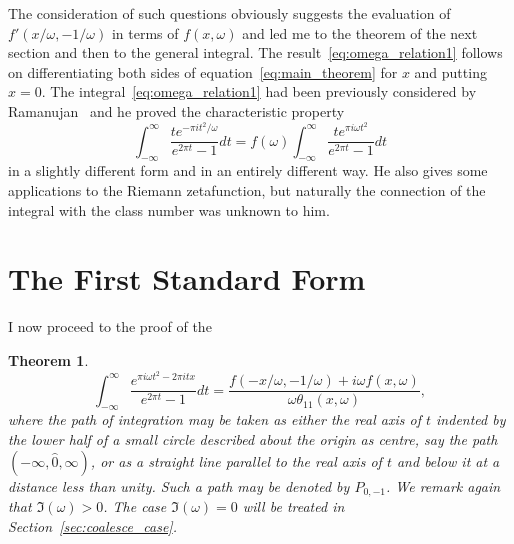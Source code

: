 \documentclass[12pt]{article}
\newtheorem{theorem}{Theorem}[section]
\theoremstyle{remark}
\begin{document}
The consideration of such questions obviously suggests the evaluation of $f'(x/\omega, -1/\omega)$ in terms of $f(x, \omega)$ and led me to the theorem of the next section and then to the general integral. The result~\eqref{eq:omega_relation1} follows on differentiating both sides of equation~\eqref{eq:main_theorem} for $x$ and putting $x = 0$. The integral~\eqref{eq:omega_relation1} had been previously considered by Ramanujan~\cite{Ramanujan1915b} and he proved the characteristic property
\begin{equation}\label{eq:ramanujan_property}
\int_{-\infty}^\infty \frac{te^{-\pi it^2/\omega}}{e^{2\pi t} - 1} dt = f(\omega) \int_{-\infty}^\infty \frac{te^{\pi i\omega t^2}}{e^{2\pi t} - 1} dt
\end{equation}
in a slightly different form and in an entirely different way. He also gives some applications to the Riemann zetafunction, but naturally the connection of the integral with the class number was unknown to him.

\section{The First Standard Form}\label{sec:first_standard_form}

I now proceed to the proof of the

\begin{theorem}\label{thm:main_theorem}
\begin{equation}\label{eq:main_theorem}
\int_{-\infty}^\infty \frac{e^{\pi i\omega t^2 - 2\pi itx}}{e^{2\pi t} - 1} dt = \frac{f(-x/\omega, -1/\omega) + i\omega f(x, \omega)}{\omega \theta_{11}(x, \omega)},
\end{equation}
where the path of integration may be taken as either the real axis of $t$ indented by the lower half of a small circle described about the origin as centre, say the path $(-\infty, \hat{0}, \infty)$, or as a straight line parallel to the real axis of $t$ and below it at a distance less than unity. Such a path may be denoted by $P_{0,-1}$. We remark again that $\Im(\omega) > 0$. The case $\Im(\omega) = 0$ will be treated in Section~\ref{sec:coalesce_case}.
\end{theorem}
\end{document}
